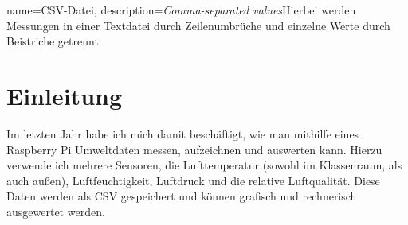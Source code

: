 {
  name=CSV-Datei,
  description={\textit{Comma-separated values}\newline Hierbei werden Messungen in einer Textdatei durch Zeilenumbrüche und einzelne Werte durch Beistriche getrennt}
}
\chapter{Einleitung}

Im letzten Jahr habe ich mich damit beschäftigt, wie man mithilfe eines Raspberry Pi Umweltdaten messen, aufzeichnen und auswerten kann. Hierzu verwende ich mehrere Sensoren, die Lufttemperatur (sowohl im Klassenraum, als auch außen), Luftfeuchtigkeit, Luftdruck und die relative Luftqualität. Diese Daten werden als \gls{CSV} gespeichert und können grafisch und rechnerisch ausgewertet werden.  